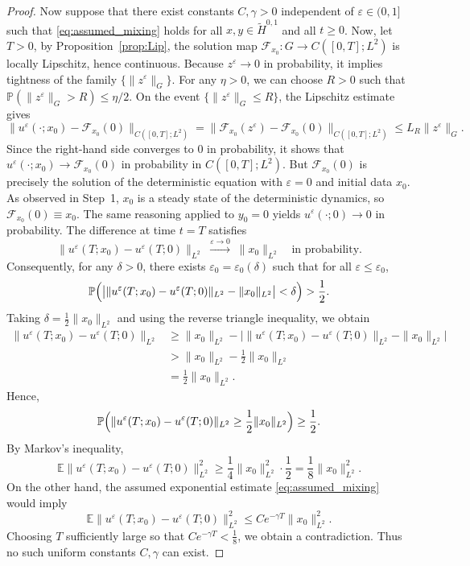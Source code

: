 \documentclass[11pt,a4paper,reqno]{amsart}
\theoremstyle{definition}
\begin{document}
\begin{proof}
Now suppose that there exist constants $C,\gamma>0$ independent of
$\varepsilon\in(0,1]$ such that \eqref{eq:assumed_mixing} holds for all
$x,y\in\widetilde H^{0,1}$ and all $t\ge0$.  Now, let $T>0$, by Proposition~\ref{prop:Lip}, the solution map
$\mathcal F_{x_0}: G \to C([0,T];L^2)$ is locally Lipschitz, hence continuous. Because
$z^\varepsilon\to0$ in probability, it implies tightness of the family
$\{\|z^\varepsilon\|_G\}$.
For any $\eta>0$, we can choose $R>0$ such that
$\mathbb{P}(\|z^\varepsilon\|_G > R) \le \eta/2$.  On the event $\{\|z^\varepsilon\|_G \le R\}$, the
Lipschitz estimate gives
\[
\|u^\varepsilon(\cdot;x_0) - \mathcal F_{x_0}(0)\|_{C([0,T];L^2)}
= \|\mathcal F_{x_0}(z^\varepsilon) - \mathcal F_{x_0}(0)\|_{C([0,T];L^2)}
\le L_R \|z^\varepsilon\|_G .
\]
Since the right-hand side converges to $0$
in probability, it shows that
$u^\varepsilon(\cdot;x_0) \to \mathcal F_{x_0}(0)$ in probability in
$C([0,T];L^2)$.  But $\mathcal F_{x_0}(0)$ is precisely the solution of the
deterministic equation with $\varepsilon=0$ and initial data $x_0$.  As
observed in Step~1, $x_0$ is a steady state of the deterministic dynamics,
so $\mathcal F_{x_0}(0) \equiv x_0$.  The same reasoning applied to $y_0=0$
yields $u^\varepsilon(\cdot;0) \to 0$ in probability.
The difference at time $t=T$ satisfies
\[
\|u^\varepsilon(T;x_0)-u^\varepsilon(T;0)\|_{L^2}
\;\xrightarrow{\varepsilon\to0}\;
\|x_0\|_{L^2} \quad\text{in probability}.
\]
Consequently, for any $\delta>0$, there exists \(\varepsilon_0=\varepsilon_0(\delta)\) such that for all
\(\varepsilon\le\varepsilon_0\),
\[
  \mathbb P\Bigl( \bigl| \|u^\varepsilon(T;x_0)-u^\varepsilon(T;0)\|_{L^2} - \|x_0\|_{L^2} \bigr| < \delta \Bigr) > \frac12 .
\]
Taking \(\delta = \frac12\|x_0\|_{L^2}\) and using the reverse triangle inequality, we obtain
\begin{align*}
  \|u^\varepsilon(T;x_0)-u^\varepsilon(T;0)\|_{L^2}
  &\ge \|x_0\|_{L^2} - \bigl| \|u^\varepsilon(T;x_0)-u^\varepsilon(T;0)\|_{L^2} - \|x_0\|_{L^2} \bigr|\\
  &> \|x_0\|_{L^2} - \frac12\|x_0\|_{L^2}\\
  &= \frac12\|x_0\|_{L^2}.
\end{align*}
 Hence,
\[
  \mathbb P\Bigl( \|u^\varepsilon(T;x_0)-u^\varepsilon(T;0)\|_{L^2}
  \ge \frac12\|x_0\|_{L^2} \Bigr)
  \ge\frac12 .
\]
By Markov's inequality,
\[
  \mathbb E\|u^\varepsilon(T;x_0)-u^\varepsilon(T;0)\|_{L^2}^2
  \ge \frac14\|x_0\|_{L^2}^2 \cdot \frac12
  = \frac18\|x_0\|_{L^2}^2 .
\]
On the other hand, the assumed exponential estimate
\eqref{eq:assumed_mixing} would imply
\[
  \mathbb E\|u^\varepsilon(T;x_0)-u^\varepsilon(T;0)\|_{L^2}^2
  \le C e^{-\gamma T} \|x_0\|_{L^2}^2 .
\]
Choosing $T$ sufficiently large so that $C e^{-\gamma T} < \frac18$, we
obtain a contradiction.  Thus no such uniform constants $C,\gamma$ can
exist.
\end{proof}
\end{document}
